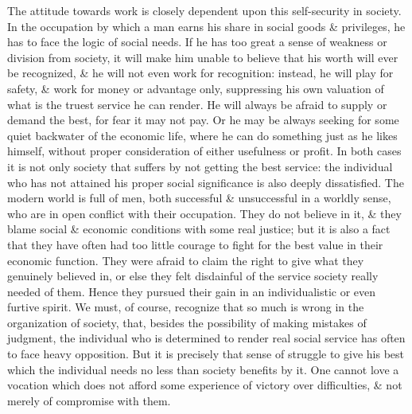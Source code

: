 \documentclass{article}
\numberwithin{equation}{section}
\begin{document}
The attitude towards work is closely dependent upon this self-security in society. In the occupation by which a man earns his share in social goods \& privileges, he has to face the logic of social needs. If he has too great a sense of weakness or division from society, it will make him unable to believe that his worth will ever be recognized, \& he will not even work for recognition: instead, he will play for safety, \& work for money or advantage only, suppressing his own valuation of what is the truest service he can render. He will always be afraid to supply or demand the best, for fear it may not pay. Or he may be always seeking for some quiet backwater of the economic life, where he can do something just as he likes himself, without proper consideration of either usefulness or profit. In both cases it is not only society that suffers by not getting the best service: the individual who has not attained his proper social significance is also deeply dissatisfied. The modern world is full of men, both successful \& unsuccessful in a worldly sense, who are in open conflict with their occupation. They do not believe in it, \& they blame social \& economic conditions with some real justice; but it is also a fact that they have often had too little courage to fight for the best value in their economic function. They were afraid to claim the right to give what they genuinely believed in, or else they felt disdainful of the service society really needed of them. Hence they pursued their gain in an individualistic or even furtive spirit. We must, of course, recognize that so much is wrong in the organization of society, that, besides the possibility of making mistakes of judgment, the individual who is determined to render real social service has often to face heavy opposition. But it is precisely that sense of struggle to give his best which the individual needs no less than society benefits by it. One cannot love a vocation which does not afford some experience of victory over difficulties, \& not merely of compromise with them.
\end{document}
